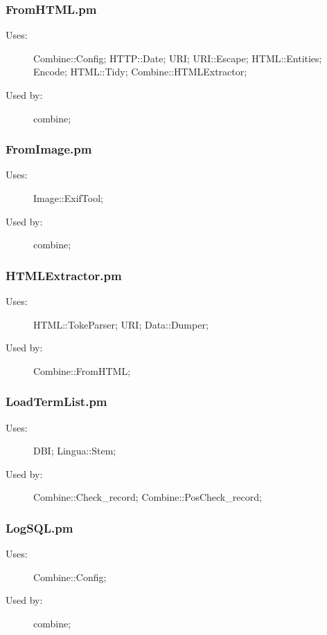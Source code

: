 \subsubsection{FromHTML.pm}
\begin{description}
\item[Uses:] Combine::Config; HTTP::Date; URI; URI::Escape; HTML::Entities; Encode; HTML::Tidy; Combine::HTMLExtractor; 

\item[Used by:] combine; 

\end{description}
\subsubsection{FromImage.pm}
\begin{description}
\item[Uses:] Image::ExifTool; 

\item[Used by:] combine; 

\end{description}
\subsubsection{HTMLExtractor.pm}
\begin{description}
\item[Uses:] HTML::TokeParser; URI; Data::Dumper; 

\item[Used by:] Combine::FromHTML; 

\end{description}
\subsubsection{LoadTermList.pm}
\begin{description}
\item[Uses:] DBI; Lingua::Stem; 

\item[Used by:] Combine::Check\_record; Combine::PosCheck\_record; 

\end{description}
\subsubsection{LogSQL.pm}
\begin{description}
\item[Uses:] Combine::Config; 

\item[Used by:] combine; 

\end{description}
